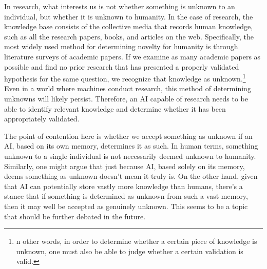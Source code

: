 
In research, what interests us is not whether something is unknown to an individual, but whether it is unknown to humanity. In the case of research, the knowledge base consists of the collective media that records human knowledge, such as all the research papers, books, and articles on the web. Specifically, the most widely used method for determining novelty for humanity is through literature surveys of academic papers. If we examine as many academic papers as possible and find no prior research that has presented a properly validated hypothesis for the same question, we recognize that knowledge as unknown.\footnote{
n other words, in order to determine whether a certain piece of knowledge is unknown, one must also be able to judge whether a certain validation is valid.
} Even in a world where machines conduct research, this method of determining unknowns will likely persist. Therefore, an AI capable of research needs to be able to identify relevant knowledge and determine whether it has been appropriately validated.

The point of contention here is whether we accept something as unknown if an AI, based on its own memory, determines it as such. In human terms, something unknown to a single individual is not necessarily deemed unknown to humanity. Similarly, one might argue that just because AI, based solely on its memory, deems something as unknown doesn't mean it truly is. On the other hand, given that AI can potentially store vastly more knowledge than humans, there's a stance that if something is determined as unknown from such a vast memory, then it may well be accepted as genuinely unknown. This seems to be a topic that should be further debated in the future.


